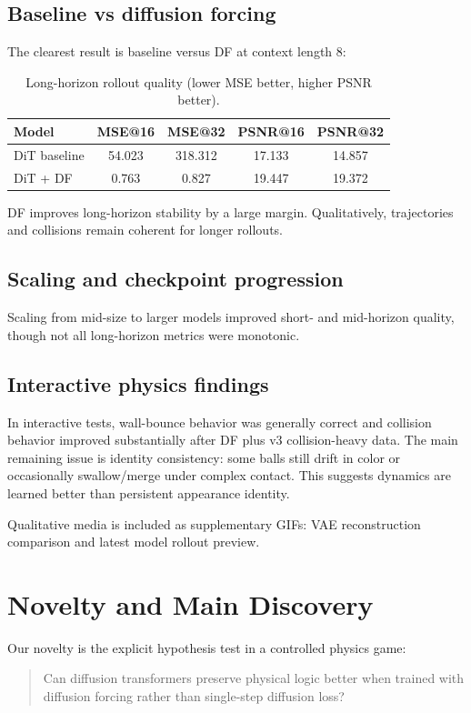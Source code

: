 \documentclass[11pt]{article}
\begin{document}
\subsection{Baseline vs diffusion forcing}
The clearest result is baseline versus DF at context length 8:
\begin{table}[h]
\centering
\begin{tabular}{lcccc}
\toprule
Model & MSE@16 & MSE@32 & PSNR@16 & PSNR@32 \\
\midrule
DiT baseline & 54.023 & 318.312 & 17.133 & 14.857 \\
DiT + DF & 0.763 & 0.827 & 19.447 & 19.372 \\
\bottomrule
\end{tabular}
\caption{Long-horizon rollout quality (lower MSE better, higher PSNR better).}
\label{tab:baseline_df}
\end{table}

DF improves long-horizon stability by a large margin. Qualitatively, trajectories and collisions remain coherent for longer rollouts.

\subsection{Scaling and checkpoint progression}
Scaling from mid-size to larger models improved short- and mid-horizon quality, though not all long-horizon metrics were monotonic.

\subsection{Interactive physics findings}
In interactive tests, wall-bounce behavior was generally correct and collision behavior improved substantially after DF plus v3 collision-heavy data. The main remaining issue is identity consistency: some balls still drift in color or occasionally swallow/merge under complex contact. This suggests dynamics are learned better than persistent appearance identity.

Qualitative media is included as supplementary GIFs: VAE reconstruction comparison and latest model rollout preview.

\section{Novelty and Main Discovery}
Our novelty is the explicit hypothesis test in a controlled physics game:
\begin{quote}
Can diffusion transformers preserve physical logic better when trained with diffusion forcing rather than single-step diffusion loss?
\end{quote}
\end{document}
